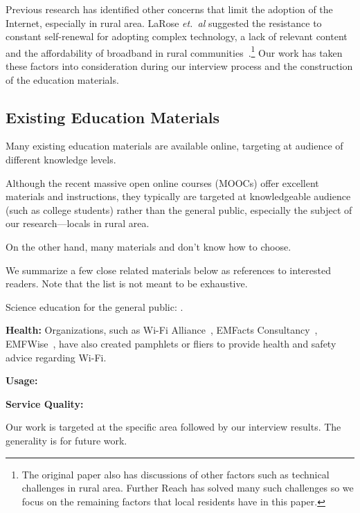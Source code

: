 Previous research has identified other concerns that limit the adoption of the
Internet, especially in rural area. LaRose {\em et.~al} suggested the resistance
to constant self-renewal for adopting complex technology, a lack of relevant
content and the affordability of broadband in rural
communities~\cite{larose2007closing}.\footnote{The original paper also has
  discussions of other factors such as technical challenges in rural
  area. Further Reach has solved many such challenges so we focus on the
  remaining factors that local residents have in this paper.} Our work has taken
these factors into consideration during our interview process and the
construction of the education materials.

\subsection{Existing Education Materials}
\label{sec:exist-educ-mater}

Many existing education materials are available online, targeting at audience of
different knowledge levels.

Although the recent massive open online courses (MOOCs) \cite{pappano2012year}
offer excellent materials and instructions, they typically are targeted at
knowledgeable audience (such as college students) rather than the general
public, especially the subject of our research---locals in rural area.

On the other hand, many materials and don't know how to choose.

We summarize a few close related
materials below as references to interested readers. Note that the list is not
meant to be exhaustive.

 Science education for the general public: \cite{nih, usf}.

{\bf Health:} Organizations, such as Wi-Fi Alliance~\cite{wifi2015health},
EMFacts Consultancy~\cite{emfacts2015wireless}, EMFWise~\cite{emfwise}, have
also created pamphlets or fliers to provide health and safety advice regarding
Wi-Fi.

{\bf Usage:}
\cite{masstech, internetbasics}

{\bf Service Quality:}
\cite{speedmatters, ftth}

Our work is targeted at the specific area followed by our interview results. The
generality is for future work.

